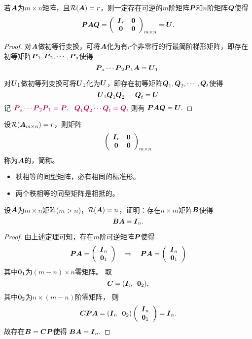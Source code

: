\begin{frame}
\begin{dingli}
  若$\boldsymbol{A}$为$m\times n$矩阵，且$\mathcal{R}(\boldsymbol{A})=r$，则一定存在可逆的$m$阶矩阵$\boldsymbol{P}$和$n$阶矩阵$\boldsymbol{Q}$使得
  $$
  \MP\MA\MQ=\left(
    \begin{array}{cc}
      \MI_r&\M0\\
      \M0&\M0
    \end{array}
  \right)_{m\times n} = \MU.
  $$
\end{dingli}\pause 
\begin{proof}
对$\boldsymbol{A}$做初等行变换，可将$\boldsymbol{A}$化为有$r$个非零行的行最简阶梯形矩阵，即存在初等矩阵$\boldsymbol{P}_1,\boldsymbol{P}_2,\cdots,\boldsymbol{P}_s$使得
$$
\boldsymbol{P}_s\cdots\boldsymbol{P}_2\boldsymbol{P}_1\boldsymbol{A}=\boldsymbol{U}_1.
$$

对$\boldsymbol{U}_1$做初等列变换可将$\boldsymbol{U}_1$化为$\boldsymbol{U}$，即存在初等矩阵$\boldsymbol{Q}_1,\boldsymbol{Q}_2,\cdots,\boldsymbol{Q}_t$使得
$$
\boldsymbol{U}_1\boldsymbol{Q}_1\boldsymbol{Q}_2\cdots\boldsymbol{Q}_t=\boldsymbol{U}
$$
记
$
\textcolor{purple}{\boldsymbol{P}_s\cdots\boldsymbol{P}_2\boldsymbol{P}_1=\boldsymbol{P}, ~~\boldsymbol{Q}_1\boldsymbol{Q}_2\cdots\boldsymbol{Q}_t=\boldsymbol{Q},}
$
则有
$
\boldsymbol{P}\boldsymbol{A}\boldsymbol{Q}=\boldsymbol{U}.
$
\end{proof}
\end{frame}

\begin{frame}
\begin{dingyi}[相抵标准形]
  设$\mathcal{R}(\boldsymbol{A}_{m\times n})=r$，则矩阵
  $$
  \left(
    \begin{array}{cc}
      \MI_r&\M0\\
      \M0&\M0
    \end{array}
  \right)_{m\times n} 
  $$称为$\boldsymbol{A}$的，简称。
\end{dingyi}
\begin{itemize}
\item 秩相等的同型矩阵，必有相同的标准形。
\item 两个秩相等的同型矩阵是相抵的。
\end{itemize}

\end{frame}

\begin{frame}
\begin{li}
  设$\boldsymbol{A}$为$m\times n$矩阵($m>n$)，$\mathcal{R}(\boldsymbol{A})=n$，证明：存在$n\times m$矩阵$\boldsymbol{B}$使得
  $$
  \boldsymbol{B}\boldsymbol{A}=\boldsymbol{I}_n.
  $$
\end{li}\pause 
\begin{proof}
由上述定理可知，存在$m$阶可逆矩阵$\boldsymbol{P}$使得
$$
\MP\MA=\left(
  \begin{array}{c}
    \MI_n\\
    \M0_1
  \end{array}
\right)     
~~~\Rightarrow~~~
\MP\MA=\left(
  \begin{array}{c}
    \MI_n\\
    \M0_1
  \end{array}
\right)
$$
其中$\M0_1$为$(m-n)\times n$零矩阵。
取
$$
\MC=(\MI_n~~\M0_2),
$$
其中$\M0_2$为$n\times(m-n)$阶零矩阵， 则
$$
\MC\MP\MA=(\MI_n~~\M0_2)\left(
  \begin{array}{c}
    \MI_n\\
    \M0_1
  \end{array}
\right)=\MI_n.
$$ 
故存在$\boldsymbol{B}=\boldsymbol{C}\boldsymbol{P}$使得
$
\boldsymbol{B}\boldsymbol{A}=\boldsymbol{I}_n.
$
\end{proof}
\end{frame}

